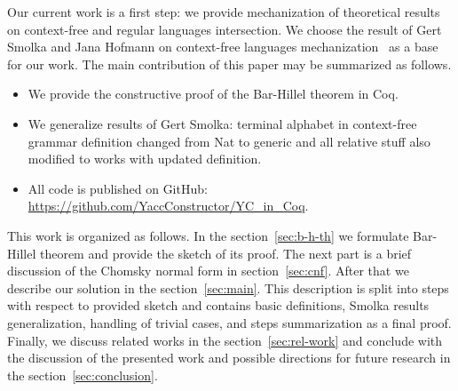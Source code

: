 Our current work is a first step: we provide mechanization of theoretical results on context-free and regular languages intersection.
We choose the result of Gert Smolka and Jana Hofmann on context-free languages mechanization~\cite{smolkaHofmann2016} as a base for our work.
The main contribution of this paper may be summarized as follows.
\begin{itemize}
\item We provide the constructive proof of the Bar-Hillel theorem in Coq.
\item We generalize results of Gert Smolka: terminal alphabet in context-free grammar definition changed from Nat to generic and all relative stuff also modified to works with updated definition.
\item All code is published on GitHub: \url{https://github.com/YaccConstructor/YC_in_Coq}.
\end{itemize}

This work is organized as follows.
In the section~\ref{sec:b-h-th} we formulate Bar-Hillel theorem and provide the sketch of its proof.
The next part is a brief discussion of the Chomsky normal form in section~\ref{sec:cnf}.
After that we describe our solution in the section~\ref{sec:main}.
This description is split into steps with respect to provided sketch and contains basic definitions, Smolka results generalization, handling of trivial cases, and steps summarization as a final proof.
Finally, we discuss related works in the section~\ref{sec:rel-work} and conclude with the discussion of the presented work and possible directions for future research in the section~\ref{sec:conclusion}.

